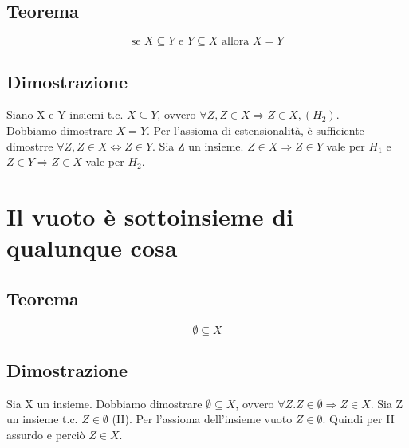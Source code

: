\documentclass[12pt]{article}
\begin{document}
\subsection{Teorema}
\begin{equation}
    \text{se } X \subseteq Y \text{ e } Y \subseteq X \text{ allora } X = Y \label{teo:anti-simmetria_subseteq}
\end{equation}
\subsection{Dimostrazione}
Siano X e Y insiemi t.c. $X \subseteq Y$, ovvero $\forall Z, Z \in X \Rightarrow Z \in X, (H_2)$.\\
Dobbiamo dimostrare $X = Y$. Per l'assioma di estensionalità, è sufficiente dimostrre $\forall Z, Z \in X \Leftrightarrow Z \in Y$. Sia Z un insieme. $Z \in X \Rightarrow Z \in Y$ vale per $H_1$ e $Z \in Y \Rightarrow Z \in X$ vale per $H_2$.
\section{Il vuoto è sottoinsieme di qualunque cosa}
\subsection{Teorema}
\begin{equation}
    \emptyset \subseteq X \label{teo:vuoto_subset_tutto}
\end{equation}
\subsection{Dimostrazione}
Sia X un insieme. Dobbiamo dimostrare $\emptyset \subseteq X$, ovvero $\forall Z. Z \in \emptyset \Rightarrow Z \in X$. Sia Z un insieme t.c. $Z \in \emptyset$ (H). Per l'assioma dell'insieme vuoto $Z \in \emptyset$. Quindi per H assurdo e perciò $Z \in X$.
\end{document}
